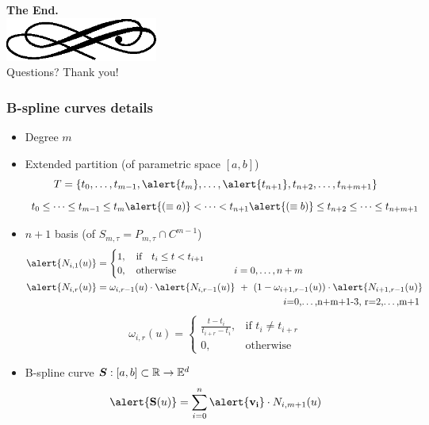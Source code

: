 \begin{frame}
  \begin{center}
	\textbf{\calligra\Huge The End.}\\
  \includegraphics[width=5cm]{img/ornament.eps}\\[1cm]
	\pause
	{\huge\calligra Questions?\pause{} Thank you!}
  \end{center}
\end{frame}

\appendix

\begin{frame}
  \frametitle{B-spline curves details}
  \begin{itemize}
  \item Degree \alert{$m$}\pause
  \item Extended \alert{partition} (of parametric
    space \alert{$[a,b]$})
    $$
    T=\{t_0,\dots,t_{m-1},\alert{t_{m}},\dots,\alert{t_{n+1}},t_{n+2},\dots,t_{n+m+1}\}
    $$
    {\tiny
      $$
      t_0\leq\dots\leq t_{m-1}\leq t_{m}\alert{(\equiv a)} <\dots<
      t_{n+1}\alert{(\equiv b)} \leq t_{n+2}\leq\dots\leq t_{n+m+1}
      $$
    }\pause
  \item \alert{$n+1$ basis} (of $S_{m,\tau}=P_{m,\tau}\cap C^{m-1}$)
    {\tiny
      \begin{align*}
        \alert{N_{i,1}(u)} &=
                     \begin{cases}
                       1,\quad \mbox{if}\quad t_i\leq t<t_{i+1}\\
                       0,\quad \mbox{otherwise}\qquad\qquad\qquad i=0,\dots,n+m
                     \end{cases}\\
        \alert{N_{i,r}(u)} &= \omega_{i,r-1}(u)\cdot \alert{N_{i,r-1}(u)}\ +\
                     (1-\omega_{i+1,r-1}(u))\cdot \alert{N_{i+1,r-1}(u)}\\
                   &\pushright i=0,\dots,n+m+1-3,\ r=2,\dots,m+1
      \end{align*}
    }
    {\tiny
      $$
      \omega_{i,r}(u) = \begin{cases}
        \frac{t-t_i}{t_{i+r}-t_i},&\mbox{if }t_i\neq t_{i+r}\\
        0, &\mbox{otherwise}
      \end{cases}
      $$
    }\pause
  \item B-spline curve $\boldsymbol{S}:[a,b]\subset\mathbb{R}\rightarrow\mathbb{E}^d$
    $$
    \alert{\mathbf{S}(u)}=\sum_{i=0}^n\alert{\mathbf{v_i}}\cdot N_{i,m+1}(u)
    $$
  \end{itemize}
\end{frame}

